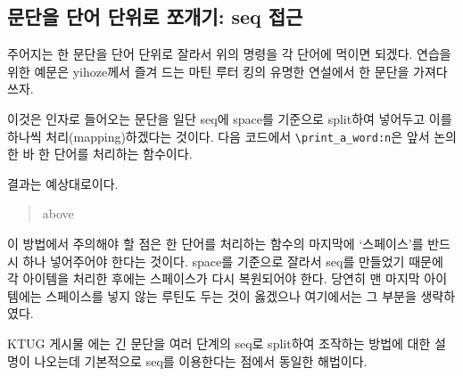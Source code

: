 \documentclass[a4paper]{oblivoir}
\begin{document}
\subsection{문단을 단어 단위로 쪼개기: seq 접근}

주어지는 한 문단을 단어 단위로 잘라서 위의 명령을 각 단어에 먹이면 되겠다. 연습을 위한 예문은 yihoze께서 즐겨 드는 마틴 루터 킹의 유명한 연설에서 
한 문단을 가져다 쓰자.

이것은 인자로 들어오는 문단을 일단 seq에 space를 기준으로 split하여 넣어두고 이를 하나씩 처리(mapping)하겠다는 것이다.
다음 코드에서 \verb|\print_a_word:n|은 앞서 논의한 바 한 단어를 처리하는 함수이다.


결과는 예상대로이다.

\begin{quote}
\begin{mylistingtext}{above}
\end{mylistingtext}
\end{quote}

이 방법에서 주의해야 할 점은 한 단어를 처리하는 함수의 마지막에 `스페이스'를 반드시 하나 넣어주어야 한다는 것이다. space를 기준으로 잘라서 seq를 만들었기 때문에 
각 아이템을 처리한 후에는 스페이스가 다시 복원되어야 한다. 당연히 맨 마지막 아이템에는 스페이스를 넣지 않는 루틴도 두는 것이 옳겠으나 여기에서는 그 부분을 생략하였다. 

KTUG 게시물 \cite{ktug2019q}에는 긴 문단을 여러 단계의 seq로 split하여 조작하는 방법에 대한 설명이 나오는데 기본적으로 seq를 이용한다는 점에서 동일한 해법이다.
\end{document}
